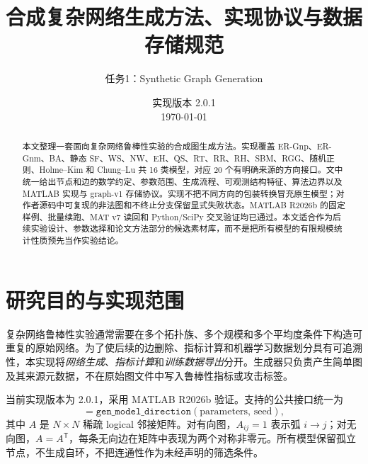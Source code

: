 \documentclass[UTF8,a4paper,11pt]{ctexart}
\title{合成复杂网络生成方法、实现协议与数据存储规范}
\author{任务1：Synthetic Graph Generation}
\date{实现版本 2.0.1\\\today}
\begin{document}
\maketitle

\begin{abstract}
本文整理一套面向复杂网络鲁棒性实验的合成图生成方法。实现覆盖 ER-Gnp、ER-Gnm、BA、静态 SF、WS、NW、EH、QS、RT、RR、RH、SBM、RGG、随机正则、Holme--Kim 和 Chung--Lu 共 16 类模型，对应 20 个有明确来源的方向接口。文中统一给出节点和边的数学约定、参数范围、生成流程、可观测结构特征、算法边界以及 MATLAB 实现与 graph-v1 存储协议。实现不把不同方向的包装转换冒充原生模型；对作者源码中可复现的非法图和不终止分支保留显式失败状态。MATLAB R2026b 的固定样例、批量续跑、MAT v7 读回和 Python/SciPy 交叉验证均已通过。本文适合作为后续实验设计、参数选择和论文方法部分的候选素材库，而不是把所有模型的有限规模统计性质预先当作实验结论。
\end{abstract}
\tableofcontents

\section{研究目的与实现范围}
复杂网络鲁棒性实验通常需要在多个拓扑族、多个规模和多个平均度条件下构造可重复的原始网络。为了使后续的边删除、指标计算和机器学习数据划分具有可追溯性，本实现将\emph{网络生成}、\emph{指标计算}和\emph{训练数据导出}分开。生成器只负责产生简单图及其来源元数据，不在原始图文件中写入鲁棒性指标或攻击标签。

当前实现版本为 2.0.1，采用 MATLAB R2026b 验证。支持的公共接口统一为
\begin{equation}
 [A,\,\mathrm{meta}]=\texttt{gen\_model\_direction}(\text{parameters},\,\text{seed}),
\end{equation}
其中 $A$ 是 $N\times N$ 稀疏 logical 邻接矩阵。对有向图，$A_{ij}=1$ 表示弧 $i\rightarrow j$；对无向图，$A=A^{\mathsf T}$，每条无向边在矩阵中表现为两个对称非零元。所有模型保留孤立节点，不生成自环，不把连通性作为未经声明的筛选条件。
\end{document}
